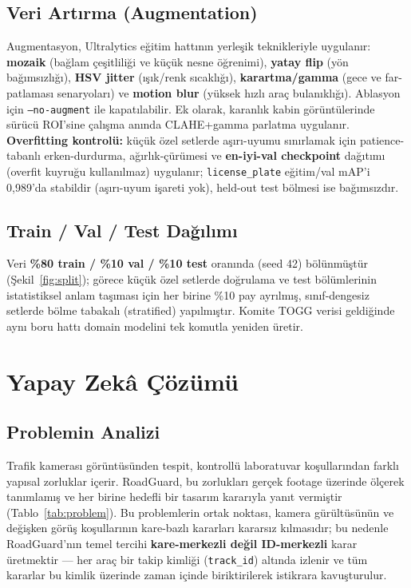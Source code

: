 \documentclass[12pt,a4paper]{article}
\newcommand{\tcode}[1]{\texttt{\small #1}}
\begin{document}
\subsection{Veri Artırma (Augmentation)}
Augmentasyon, Ultralytics eğitim hattının yerleşik teknikleriyle uygulanır: \textbf{mozaik}
(bağlam çeşitliliği ve küçük nesne öğrenimi), \textbf{yatay flip} (yön bağımsızlığı), \textbf{HSV
jitter} (ışık/renk sıcaklığı), \textbf{karartma/gamma} (gece ve far-patlaması senaryoları) ve
\textbf{motion blur} (yüksek hızlı araç bulanıklığı). Ablasyon için \tcode{--no-augment} ile
kapatılabilir. Ek olarak, karanlık kabin görüntülerinde sürücü ROI'sine çalışma anında CLAHE+gamma
parlatma uygulanır. \textbf{Overfitting kontrolü:} küçük özel setlerde aşırı-uyumu sınırlamak için
patience-tabanlı erken-durdurma, ağırlık-çürümesi ve \textbf{en-iyi-val checkpoint} dağıtımı (overfit
kuyruğu kullanılmaz) uygulanır; \tcode{license\_plate} eğitim/val mAP'i 0,989'da stabildir (aşırı-uyum
işareti yok), held-out test bölmesi ise bağımsızdır.

\subsection{Train / Val / Test Dağılımı}
Veri \textbf{\%80 train / \%10 val / \%10 test} oranında (seed 42) bölünmüştür (Şekil~\ref{fig:split});
görece küçük özel setlerde doğrulama ve test bölümlerinin istatistiksel anlam taşıması için her birine
\%10 pay ayrılmış, sınıf-dengesiz setlerde bölme tabakalı (stratified) yapılmıştır. Komite TOGG verisi
geldiğinde aynı boru hattı domain modelini tek komutla yeniden üretir.

\section{Yapay Zekâ Çözümü}

\subsection{Problemin Analizi}
Trafik kamerası görüntüsünden tespit, kontrollü laboratuvar koşullarından farklı yapısal zorluklar
içerir. RoadGuard, bu zorlukları gerçek footage üzerinde ölçerek tanımlamış ve her birine hedefli bir
tasarım kararıyla yanıt vermiştir (Tablo~\ref{tab:problem}). Bu problemlerin ortak noktası, kamera
gürültüsünün ve değişken görüş koşullarının kare-bazlı kararları kararsız kılmasıdır; bu nedenle
RoadGuard'nın temel tercihi \textbf{kare-merkezli değil ID-merkezli} karar üretmektir — her araç bir
takip kimliği (\tcode{track\_id}) altında izlenir ve tüm kararlar bu kimlik üzerinde zaman içinde
biriktirilerek istikrara kavuşturulur.
\end{document}
